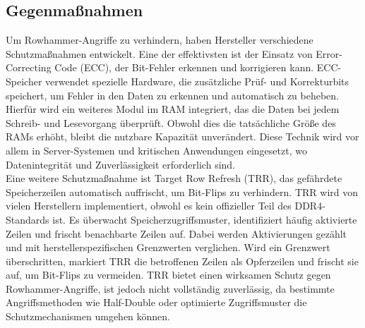 \subsection{Gegenmaßnahmen}
\label{subsec:rowhammer_gegenmanahmen}
Um Rowhammer-Angriffe zu verhindern, haben Hersteller verschiedene Schutzmaßnahmen entwickelt.
Eine der effektivsten ist der Einsatz von Error-Correcting Code (ECC), der Bit-Fehler erkennen und korrigieren kann.
ECC-Speicher verwendet spezielle Hardware, die zusätzliche Prüf- und Korrekturbits speichert, um Fehler in den Daten zu erkennen und automatisch zu beheben.
Hierfür wird ein weiteres Modul im RAM integriert, das die Daten bei jedem Schreib- und Lesevorgang überprüft.
Obwohl dies die tatsächliche Größe des RAMs erhöht, bleibt die nutzbare Kapazität unverändert.
Diese Technik wird vor allem in Server-Systemen und kritischen Anwendungen eingesetzt, wo Datenintegrität und Zuverlässigkeit erforderlich sind. \\
Eine weitere Schutzmaßnahme ist Target Row Refresh (TRR), das gefährdete Speicherzeilen automatisch auffrischt, um Bit-Flips zu verhindern.
TRR wird von vielen Herstellern implementiert, obwohl es kein offizieller Teil des DDR4-Standards ist.
Es überwacht Speicherzugriffsmuster, identifiziert häufig aktivierte Zeilen und frischt benachbarte Zeilen auf.
Dabei werden Aktivierungen gezählt und mit herstellerspezifischen Grenzwerten verglichen.
Wird ein Grenzwert überschritten, markiert TRR die betroffenen Zeilen als Opferzeilen und frischt sie auf, um Bit-Flips zu vermeiden.
TRR bietet einen wirksamen Schutz gegen Rowhammer-Angriffe, ist jedoch nicht vollständig zuverlässig, da bestimmte Angriffsmethoden wie Half-Double oder optimierte Zugriffsmuster die Schutzmechanismen umgehen können.
